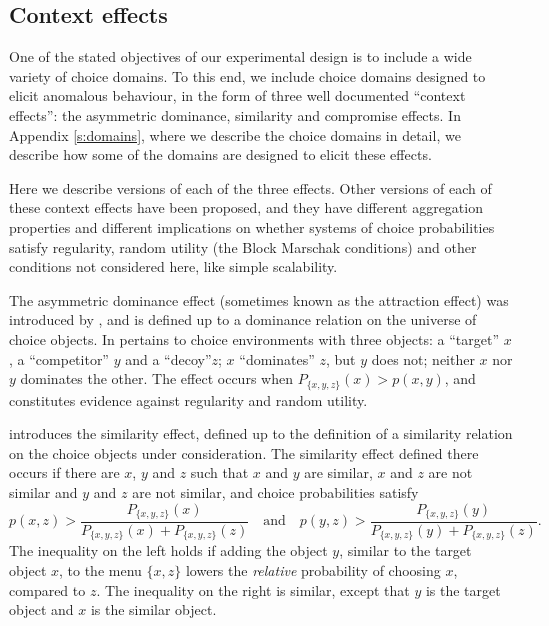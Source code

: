 \documentclass[11pt,letter]{article}
\newcommand{\menu}{menu}
\begin{document}
\subsection{Context effects}

One of the stated objectives of our experimental design is to include a wide variety of choice domains.
To this end, we include choice domains designed to elicit anomalous behaviour, in the form of three well documented ``context effects'': the asymmetric dominance, similarity and compromise effects.
In Appendix \ref{s:domains}, where we describe the choice domains in detail, we describe how some of the domains are designed to elicit these effects.

Here we describe versions of each of the three effects.
Other versions of each of these context effects have been proposed, and they have different aggregation properties and different implications on whether systems of choice probabilities satisfy regularity, random utility (the Block Marschak conditions) and other conditions not considered here, like  simple scalability.

The asymmetric dominance effect (sometimes known as the attraction effect) was introduced by , and is defined up to a dominance relation on the universe of choice objects.
In pertains to choice environments with three objects: a ``target'' $x$, a ``competitor'' $y$ and a ``decoy''$z$; $x$ ``dominates'' $z$, but $y$ does not; neither $x$ nor $y$ dominates the other.
The effect occurs when $P_{\{x,y,z\}}(x) > p(x,y)$, and constitutes evidence against regularity and random utility.

 introduces the similarity effect, defined up to the definition of a similarity relation on the choice objects under consideration.
The similarity effect defined there occurs if there are $x$, $y$ and $z$ such that $x$ and $y$ are similar, $x$ and $z$ are not similar and $y$ and $z$ are not similar, and choice probabilities satisfy
\[
	p(x,z) > \frac{P_{\{x,y,z\}}(x)}{P_{\{x,y,z\}}(x) + P_{\{x,y,z\}}(z)}
	\quad \mbox{and} \quad
	p(y,z) > \frac{P_{\{x,y,z\}}(y)}{P_{\{x,y,z\}}(y) + P_{\{x,y,z\}}(z)}.
\]
The inequality on the left holds if adding the object $y$, similar to the target object $x$, to the \menu{} $\{x,z\}$ lowers the {\em relative} probability of choosing $x$, compared to $z$.
The inequality on the right is similar, except that $y$ is the target object and $x$ is the similar object.
\end{document}
